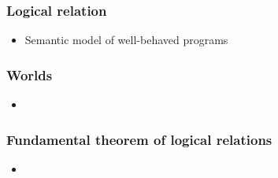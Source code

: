 \documentclass[handout]{beamer}
\begin{document}
\begin{frame}
  \frametitle{Logical relation}
  \begin{itemize}
  \item Semantic model of well-behaved programs 
  \end{itemize}
\end{frame}

\begin{frame}
  \frametitle{Worlds}
  \begin{itemize}
  \item
  \end{itemize}
\end{frame}

\begin{frame}
  \frametitle{Fundamental theorem of logical relations}
  \begin{itemize}
  \item 
  \end{itemize}
\end{frame}

% 
\end{document}

